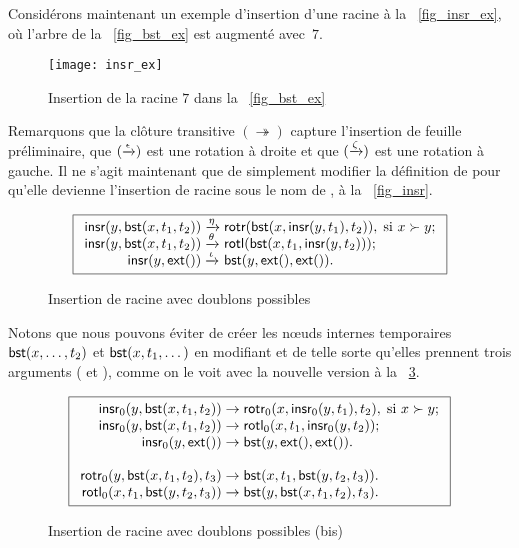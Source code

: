 Considérons maintenant un exemple d'insertion d'une racine à la
\fig~\vref{fig_insr_ex}, où l'arbre de la \fig~\vref{fig_bst_ex} est
augmenté avec~\(7\).
\begin{figure}
\centering
\texttt{[image: insr\_ex]}%
\caption{Insertion de la racine \(7\) dans la \fig~\vref{fig_bst_ex}
\label{fig_insr_ex}}
\end{figure}
Remarquons que la clôture transitive \((\twoheadrightarrow)\) capture
l'insertion de feuille préliminaire, que
\((\xrightarrow{\smash{\epsilon}})\) est une rotation à droite et que
\((\xrightarrow{\smash{\zeta}})\) est une rotation à gauche. Il ne
s'agit maintenant que de simplement modifier la définition de
 pour qu'elle devienne l'insertion de racine sous le nom
de , à la \fig~\vref{fig_insr}.
\begin{figure}
\begin{equation*}
\boxed{
\begin{array}{r@{\;}l@{\;}l}
\fun{insr}(y,\fun{bst}(x,t_1,t_2)) & \xrightarrow{\smash{\eta}} &
  \fun{rotr}(\fun{bst}(x,\fun{insr}(y,t_1),t_2)),
  \; \text{si \(x \succ y\)};\\
\fun{insr}(y,\fun{bst}(x,t_1,t_2)) & \xrightarrow{\smash{\theta}} &
  \fun{rotl}(\fun{bst}(x,t_1,\fun{insr}(y,t_2)));\\
\fun{insr}(y,\fun{ext}()) & \xrightarrow{\smash{\iota}} & \fun{bst}(y,\fun{ext}(),\fun{ext}()).
\end{array}}
\end{equation*}
\caption{Insertion de racine avec doublons possibles\label{fig_insr}}
\end{figure}
Notons que nous pouvons éviter de créer les n{\oe}uds internes
temporaires \(\textsf{bst}(x,\dots,t_2)\) et \(\textsf{bst}(x,t_1,\dots)\)
en modifiant  et  de telle sorte qu'elles
prennent trois arguments ( et ),
comme on le voit avec la nouvelle version  à la
\fig~\ref{fig_insr0}.
\begin{figure}[b]
\begin{equation*}
\boxed{
\begin{array}{r@{\;}l@{\;}l}
\fun{insr}_0(y,\fun{bst}(x,t_1,t_2)) & \rightarrow &
  \fun{rotr}_0(x,\fun{insr}_0(y,t_1),t_2),
  \; \text{si \(x \succ y\)};\\
\fun{insr}_0(y,\fun{bst}(x,t_1,t_2)) & \rightarrow &
  \fun{rotl}_0(x,t_1,\fun{insr}_0(y,t_2));\\
\fun{insr}_0(y,\fun{ext}()) & \rightarrow &
\fun{bst}(y,\fun{ext}(),\fun{ext}()).\\
\\
\fun{rotr}_0(y,\fun{bst}(x,t_1,t_2),t_3)
& \rightarrow & \fun{bst}(x,t_1,\fun{bst}(y,t_2,t_3)).\\
\fun{rotl}_0(x,t_1,\fun{bst}(y,t_2,t_3))
& \rightarrow & \fun{bst}(y,\fun{bst}(x,t_1,t_2),t_3).
\end{array}}
\end{equation*}
\caption{Insertion de racine avec doublons possibles (bis)\label{fig_insr0}}
\end{figure}

